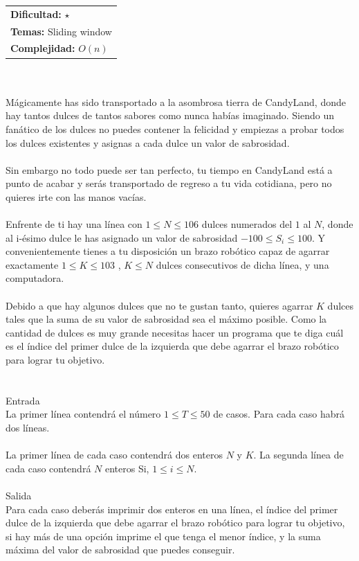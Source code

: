 \documentclass[12pt]{article}
\begin{document}
\hfill
\begin{tabular}{@{}l@{}}
\textbf{Dificultad:} $\star$ \\
\textbf{Temas:} Sliding window \\
\textbf{Complejidad:} $O(n)$
\end{tabular}\\
\\
Mágicamente has sido transportado a la asombrosa tierra de CandyLand, donde hay tantos dulces de tantos sabores como nunca habías imaginado. Siendo un fanático de los dulces no puedes contener la felicidad y empiezas a probar todos los dulces existentes y asignas a cada dulce un valor de sabrosidad.\\ \\ Sin embargo no todo puede ser tan perfecto, tu tiempo en CandyLand está a punto de acabar y serás transportado de regreso a tu vida cotidiana, pero no quieres irte con las manos vacías.\\
\\Enfrente de ti hay una línea con $1 ≤ N ≤ 106$ dulces numerados del $1$ al $N$, donde al i-ésimo dulce le has asignado un valor de sabrosidad $−100 ≤ S_i ≤ 100$. Y convenientemente tienes a tu disposición un brazo robótico capaz de agarrar exactamente $1 ≤ K ≤ 103$
, $K ≤ N$ dulces consecutivos de dicha línea, y una computadora.\\ \\Debido a que hay algunos dulces que no te gustan tanto, quieres agarrar $K$ dulces tales que la suma de su valor de sabrosidad sea el máximo posible. Como la cantidad de dulces es muy grande necesitas hacer un programa que te diga cuál es el índice del primer dulce de la izquierda que debe agarrar el brazo robótico para lograr tu objetivo.\\
\\
\\
\textrm{\large Entrada}
\\
La primer línea contendrá el número $1 ≤ T ≤ 50$ de casos. Para cada caso habrá dos líneas.\\ \\La primer línea de cada caso contendrá dos enteros $N$ y $K$. La segunda línea de cada caso contendrá $N$ enteros Si, $1 ≤ i ≤ N$.
\\
\\
\textrm{\large Salida}
\\
Para cada caso deberás imprimir dos enteros en una línea, el índice del primer dulce de la izquierda que debe agarrar el brazo robótico para lograr tu objetivo, si hay más de una opción imprime el que tenga el menor índice, y la suma máxima del valor de sabrosidad que puedes conseguir.\\
\end{document}

